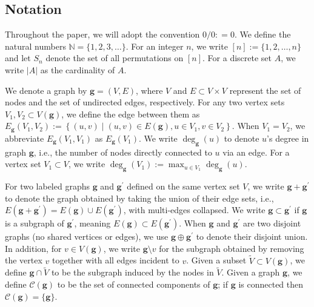 \documentclass[twoside,11pt]{article}
\theoremstyle{remark}
\begin{document}
\subsection{Notation}
Throughout the paper, we will adopt the convention $ 0/0: = 0$. We define the natural numbers $\mathbb{N} = \{1,2,3,\ldots\}$.
For an integer $n$, we write $[n] := \{1, 2, \ldots, n\}$ and let $S_n$ denote the set of all permutations on $[n]$. 
For a discrete set $A$, we write $|A|$ as the cardinality of $A$.

We denote a graph by $\boldsymbol{g}= \left(V, E\right)$, where $V$ and $E \subset V \times V$ represent the set of nodes and the set of undirected edges, respectively.
For any two vertex sets $V_1, V_2 \subset V\left(\boldsymbol{g}\right)$, we define the edge between them as  $E_{\boldsymbol{g}}\left(V_1,V_2\right):=\left\{\left(u,v\right) \mid \left(u,v\right)\in E\left(\boldsymbol{g}\right), u\in V_1, v\in V_2\right\}$. 
When $V_1=V_2$, we abbreviate
$E_{\boldsymbol{g}}\left(V_1,V_1\right)$ as $E_{\boldsymbol{g}}\left(V_1\right)$.
We write $ \operatorname{deg}_{\boldsymbol{g}}\left(u\right)$ to denote $u$'s degree in graph $\boldsymbol{g}$, i.e., the number of nodes directly connected to $u$ via an edge.
For a vertex set $V_1 \subset V$, we write $\operatorname{deg}_{\boldsymbol{g}}(V_1):= \max_{u \in V_1} \operatorname{deg}_{\boldsymbol{g}}\left(u\right)$.

For two labeled graphs $\boldsymbol{g}$ and $\boldsymbol{g}^{\prime}$ defined on the same vertex set $V$, we write $\boldsymbol{g}+\boldsymbol{g}^{\prime}$ to denote the graph obtained by taking the union of their edge sets, i.e., $E\left(\boldsymbol{g}+\boldsymbol{g}^{\prime}\right)=E\left(\boldsymbol{g}\right) \cup E\left(\boldsymbol{g}^{\prime}\right)$, with multi-edges collapsed. We write $\boldsymbol{g} \subset \boldsymbol{g}^{\prime}$ if $\boldsymbol{g}$ is a subgraph of $\boldsymbol{g}^{\prime}$, meaning $E\left(\boldsymbol{g}\right) \subset E\left(\boldsymbol{g}^{\prime}\right) $.
When $\boldsymbol{g}$ and $\boldsymbol{g}^{\prime}$ are two disjoint graphs (no shared vertices or edges), we use $\boldsymbol{g} \oplus \boldsymbol{g}^{\prime}$ to denote their disjoint union. 
In addition, for $v \in V(\boldsymbol{g})$, we write $\boldsymbol{g} \setminus v$ for the subgraph obtained by removing the vertex $v$ together with all edges incident to $v$. Given a subset $\tilde{V} \subset V(\bm{g})$, we define $\bm{g} \cap \tilde{V}$ to be the subgraph induced by the nodes in $\tilde{V}$. 
Given a graph $\bm{g}$, we define $\mathcal{C}(\bm{g})$ to be the set of connected components of $\bm{g}$; if $\bm{g}$ is connected then $\mathcal{C}(\bm{g}) = \{ \bm{g}\}$.
\end{document}
